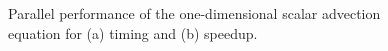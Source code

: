 \begin{figure}[h] \centering
  \caption{Parallel performance of the one-dimensional scalar advection equation for (a) timing and (b) speedup.}
  \label{fig:q2_performance}
\end{figure}

